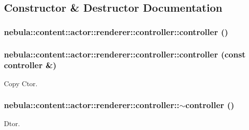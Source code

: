 \subsection{Constructor \& Destructor Documentation}
\hypertarget{classnebula_1_1content_1_1actor_1_1renderer_1_1controller_a3e96d8f9809fe0ec0808f413564bb666}{
\subsubsection[{controller}]{\setlength{\rightskip}{0pt plus 5cm}nebula::content::actor::renderer::controller::controller ()}}
\label{classnebula_1_1content_1_1actor_1_1renderer_1_1controller_a3e96d8f9809fe0ec0808f413564bb666}
\hypertarget{classnebula_1_1content_1_1actor_1_1renderer_1_1controller_ac1b790deb457fcaa7fb0ac2707152618}{
\subsubsection[{controller}]{\setlength{\rightskip}{0pt plus 5cm}nebula::content::actor::renderer::controller::controller (const {\bf controller} \&)}}
\label{classnebula_1_1content_1_1actor_1_1renderer_1_1controller_ac1b790deb457fcaa7fb0ac2707152618}


Copy Ctor. \hypertarget{classnebula_1_1content_1_1actor_1_1renderer_1_1controller_a760c5888c756e79b887c5e301c22caad}{
\subsubsection[{$\sim$controller}]{\setlength{\rightskip}{0pt plus 5cm}nebula::content::actor::renderer::controller::$\sim$controller ()}}
\label{classnebula_1_1content_1_1actor_1_1renderer_1_1controller_a760c5888c756e79b887c5e301c22caad}


Dtor. 

